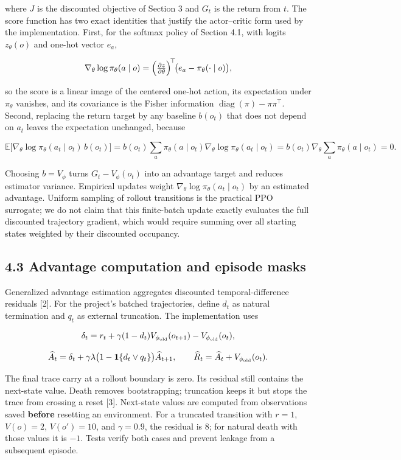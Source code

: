 \documentclass[
  11pt,
]{article}
\begin{document}
where \(J\) is the discounted objective of Section 3 and \(G_t\) is the
return from \(t\). The score function has two exact identities that
justify the actor--critic form used by the implementation. First, for
the softmax policy of Section 4.1, with logits \(z_\theta(o)\) and
one-hot vector \(e_a\),

\[
\nabla_\theta\log\pi_\theta(a\mid o)
=\Bigl(\tfrac{\partial z}{\partial\theta}\Bigr)^{\!\top}\!\bigl(e_a-\pi_\theta(\cdot\mid o)\bigr),
\]

so the score is a linear image of the centered one-hot action, its
expectation under \(\pi_\theta\) vanishes, and its covariance is the
Fisher information \(\operatorname{diag}(\pi)-\pi\pi^{\top}\). Second,
replacing the return target by any baseline \(b(o_t)\) that does not
depend on \(a_t\) leaves the expectation unchanged, because

\[
\mathbb E\bigl[\nabla_\theta\log\pi_\theta(a_t\mid o_t)\,b(o_t)\bigr]
=b(o_t)\sum_a\pi_\theta(a\mid o_t)\nabla_\theta\log\pi_\theta(a_t\mid o_t)
=b(o_t)\nabla_\theta\sum_a\pi_\theta(a\mid o_t)=0 .
\]

Choosing \(b=V_\phi\) turns \(G_t-V_\phi(o_t)\) into an advantage target
and reduces estimator variance. Empirical updates weight
\(\nabla_\theta\log\pi_\theta(a_t\mid o_t)\) by an estimated advantage.
Uniform sampling of rollout transitions is the practical PPO surrogate;
we do not claim that this finite-batch update exactly evaluates the full
discounted trajectory gradient, which would require summing over all
starting states weighted by their discounted occupancy.

\subsection{4.3 Advantage computation and episode
masks}\label{advantage-computation-and-episode-masks}

Generalized advantage estimation aggregates discounted
temporal-difference residuals {[}2{]}. For the project's batched
trajectories, define \(d_t\) as natural termination and \(q_t\) as
external truncation. The implementation uses

\[
\delta_t=r_t+\gamma(1-d_t)V_{\phi_{\rm old}}(o_{t+1})-V_{\phi_{\rm old}}(o_t),
\]

\[
\widehat A_t=\delta_t+\gamma\lambda
\bigl(1-\mathbf1\{d_t\lor q_t\}\bigr)\widehat A_{t+1},
\qquad
\widehat R_t=\widehat A_t+V_{\phi_{\rm old}}(o_t).
\]

The final trace carry at a rollout boundary is zero. Its residual still
contains the next-state value. Death removes bootstrapping; truncation
keeps it but stops the trace from crossing a reset {[}3{]}. Next-state
values are computed from observations saved \textbf{before} resetting an
environment. For a truncated transition with \(r=1\), \(V(o)=2\),
\(V(o')=10\), and \(\gamma=0.9\), the residual is \(8\); for natural
death with those values it is \(-1\). Tests verify both cases and
prevent leakage from a subsequent episode.
\end{document}
